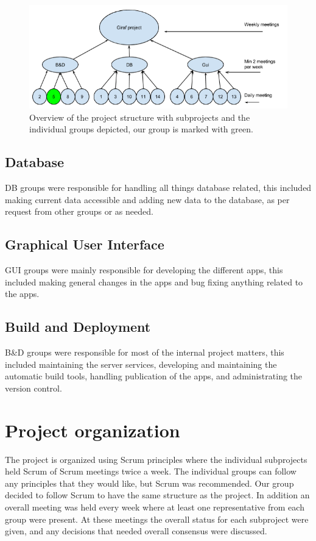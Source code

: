 \begin{figure}
	\centering
	\includegraphics[width=0.8 \textwidth]{pictures/ScrumOfScrum.png}
	\caption{Overview of the project structure with subprojects and the individual groups depicted, our group is marked with green.}
	\label{ScrumOfScrumsOverview}
\end{figure}

\subsection{Database}
DB groups were responsible for handling all things database related, this included making current data accessible and adding new data to the database, as per request from other groups or as needed.

\subsection{Graphical User Interface}
GUI groups were mainly responsible for developing the different apps, this included making general changes in the apps and bug fixing anything related to the apps.

\subsection{Build and Deployment}
B\&D groups were responsible for most of the internal project matters, this included maintaining the server services, developing and maintaining the automatic build tools, handling publication of the apps, and administrating the version control.

\section{Project organization}
The project is organized using Scrum principles where the individual subprojects held Scrum of Scrum meetings twice a week. The individual groups can follow any principles that they would like, but Scrum was recommended. Our group decided to follow Scrum to have the same structure as the project.
In addition an overall meeting was held every week where at least one representative from each group were present. At these meetings the overall status for each subproject were given, and any decisions that needed overall consensus were discussed.

